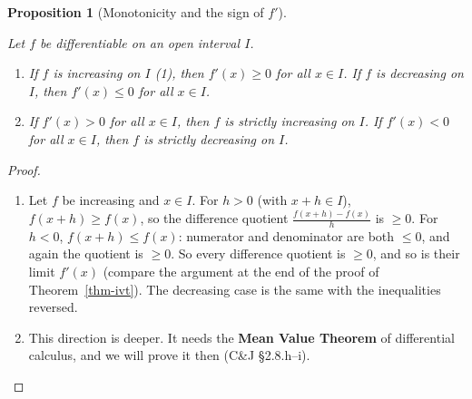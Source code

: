 \documentclass[
  letterpaper,
  DIV=11,
  numbers=noendperiod]{scrreprt}
\providecommand{\tightlist}{%
  \setlength{\itemsep}{0pt}\setlength{\parskip}{0pt}}
\theoremstyle{plain}
\theoremstyle{plain}
\newtheorem{proposition}{Proposition}[chapter]
\theoremstyle{definition}
\theoremstyle{definition}
\theoremstyle{definition}
\theoremstyle{plain}
\theoremstyle{plain}
\theoremstyle{remark}
\begin{document}
\begin{proposition}[Monotonicity and the sign of
\(f'\)]\protect\hypertarget{prp-monotone-derivative}{}\label{prp-monotone-derivative}

Let \(f\) be differentiable on an open interval \(I\).

\begin{enumerate}
\def\labelenumi{\arabic{enumi}.}
\tightlist
\item
  If \(f\) is increasing on \(I\) (1), then \(f'(x)\ge 0\) for all
  \(x\in I\). If \(f\) is decreasing on \(I\), then \(f'(x)\le0\) for
  all \(x\in I\).
\item
  If \(f'(x)>0\) for all \(x\in I\), then \(f\) is strictly increasing
  on \(I\). If \(f'(x)<0\) for all \(x\in I\), then \(f\) is strictly
  decreasing on \(I\).
\end{enumerate}

\end{proposition}

\begin{proof}
\leavevmode

\begin{enumerate}
\def\labelenumi{(\arabic{enumi})}
\item
  Let \(f\) be increasing and \(x\in I\). For \(h>0\) (with
  \(x+h\in I\)), \(f(x+h)\ge f(x)\), so the difference quotient
  \(\frac{f(x+h)-f(x)}{h}\) is \(\ge0\). For \(h<0\),
  \(f(x+h)\le f(x)\): numerator and denominator are both \(\le 0\), and
  again the quotient is \(\ge0\). So every difference quotient is
  \(\ge 0\), and so is their limit \(f'(x)\) (compare the argument at
  the end of the proof of Theorem~\ref{thm-ivt}). The decreasing case is
  the same with the inequalities reversed.
\item
  This direction is deeper. It needs the \textbf{Mean Value Theorem} of
  differential calculus, and we will prove it then (C\&J §2.8.h--i).
\end{enumerate}

\end{proof}
\end{document}
